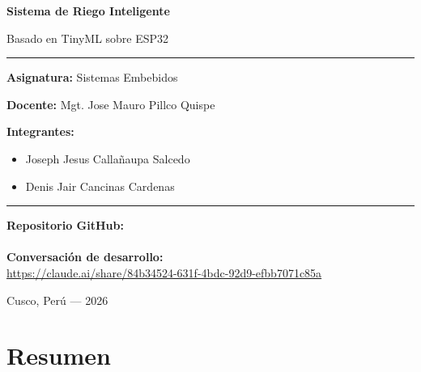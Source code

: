 \documentclass[12pt,a4paper]{article}
\begin{document}
\begin{titlepage}
  \centering
  \vspace{1.5cm}
  {\Huge\bfseries Sistema de Riego Inteligente \par}
  \vspace{0.5cm}
  {\large Basado en TinyML sobre ESP32 \par}
  \vspace{1.5cm}
  \rule{\linewidth}{0.5pt}
  \vspace{1cm}

  {\large\textbf{Asignatura:} Sistemas Embebidos\par}
  \vspace{0.3cm}
  {\large\textbf{Docente:} Mgt. Jose Mauro Pillco Quispe\par}
  \vspace{0.3cm}


  
  \textbf{Integrantes:}
  \begin{itemize}[leftmargin=4cm]
    \item Joseph Jesus Callañaupa Salcedo
    \item Denis Jair Cancinas Cardenas
  \end{itemize}\vspace{1.2cm}

  \rule{\linewidth}{0.5pt}
  \vspace{1cm}

  \textbf{Repositorio GitHub:}\\
  \url{}\\
  \vspace{0.5cm}
  \textbf{Conversación de desarrollo:}\\
  \url{https://claude.ai/share/84b34524-631f-4bdc-92d9-efbb7071c85a}\\
  \vspace{1cm}

  {\large Cusco, Perú --- 2026\par}
\end{titlepage}

\newpage

\tableofcontents
\newpage

\section*{Resumen}
\end{document}

